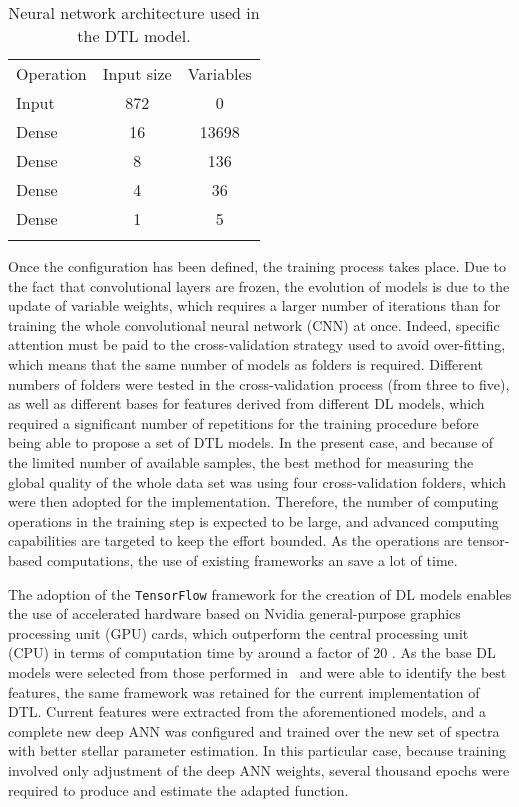 \documentclass{aa}
\begin{document}
\begin{table}[]
\caption{Neural network architecture used in the DTL model.}
\label{tab:nnDTL}
\centering %

\begin{tabular}{lcc}
\hline
\hline
    \noalign{\smallskip}
Operation & Input size & Variables \\
    \noalign{\smallskip}
\hline
    \noalign{\smallskip}
Input              & 872           & 0              \\
Dense              & 16            & 13698          \\
Dense              & 8             & 136            \\
Dense              & 4             & 36             \\
Dense              & 1             & 5              \\
    \noalign{\smallskip}
\hline
\end{tabular}
\end{table}
 
Once the configuration has been defined, the training process takes place. Due to the fact that convolutional layers are frozen, the evolution of models is due to the update of variable weights, which requires a larger number of iterations than for training the whole convolutional neural network (CNN) at once. Indeed, specific attention must be paid to the cross-validation strategy used to avoid over-fitting, which means that the same number of models as folders is required. Different numbers of folders were tested in the cross-validation process (from three to five), as well as different bases for features derived from different DL models, which required a significant number of repetitions for the training procedure before being able to propose a set of DTL models. In the present case, and because of the limited number of available samples, the best method for measuring the global quality of the whole data set was using four cross-validation folders, which were then adopted for the implementation. Therefore, the number of computing operations in the training step is expected to be large, and advanced computing capabilities are targeted to keep the effort bounded. As the operations are tensor-based computations, the use of existing frameworks an save a lot of time.

The adoption of the {\tt TensorFlow} framework \citep{abadi2016tensorflow} for the creation of DL models enables the use of accelerated hardware based on Nvidia general-purpose graphics processing unit (GPU) cards, which outperform the central processing unit (CPU) in terms of 
computation time by around a factor of 20 \citep{Mittal2019}.
As the base DL models were selected from those performed in~\cite{Passegger2020} and were able to identify the best features, the same framework was retained for the current implementation of DTL. 
Current features were extracted from the aforementioned models, and a complete new deep ANN was configured and trained over the new set of spectra with better stellar parameter estimation. In this particular case, because training involved only adjustment of the deep ANN weights, several thousand epochs were required to produce and estimate the adapted function.
\end{document}
